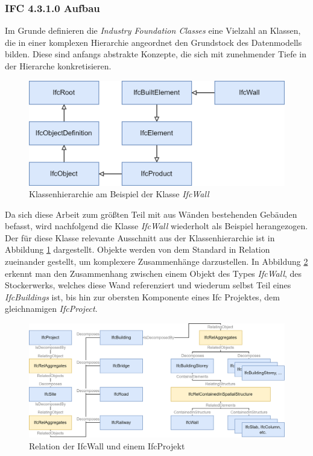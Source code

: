 \subsubsection{IFC 4.3.1.0 Aufbau}
Im Grunde definieren die \textit{Industry Foundation Classes} eine Vielzahl an Klassen, die in einer komplexen Hierarchie angeordnet den Grundstock des Datenmodells bilden.
Diese sind anfangs abstrakte Konzepte, die sich mit zunehmender Tiefe in der Hierarche konkretisieren.

\begin{figure}[ht]
    \centering
    \includegraphics[width=0.6\columnwidth]{fig/Hierarchie_IfcWall_300.drawio.png}
    \caption{Klassenhierarchie am Beispiel der Klasse \textit{IfcWall}}
    \label{fig:IfcWall_Hierarchie}
\end{figure}

Da sich diese Arbeit zum größten Teil mit aus Wänden bestehenden Gebäuden befasst, wird nachfolgend die Klasse \textit{IfcWall} wiederholt als Beispiel herangezogen.
Der für diese Klasse relevante Ausschnitt aus der Klassenhierarchie ist in Abbildung \ref{fig:IfcWall_Hierarchie} dargestellt.
Objekte werden von dem Standard in Relation zueinander gestellt, um komplexere Zusammenhänge darzustellen.
In Abbildung \ref{fig:IFC_Relationships} erkennt man den Zusammenhang zwischen einem Objekt des Types \textit{IfcWall}, des Stockerwerks, welches diese Wand referenziert und wiederum selbst Teil eines \textit{IfcBuildings} ist, bis hin zur obersten Komponente eines Ifc Projektes, dem gleichnamigen \textit{IfcProject}.

\begin{figure}[h]
    \centering
    \includegraphics[width=0.9\columnwidth]{fig/IFC_Relationships_300.drawio.png}
    \caption{Relation der IfcWall und einem IfcProjekt}
    \label{fig:IFC_Relationships}
\end{figure}

